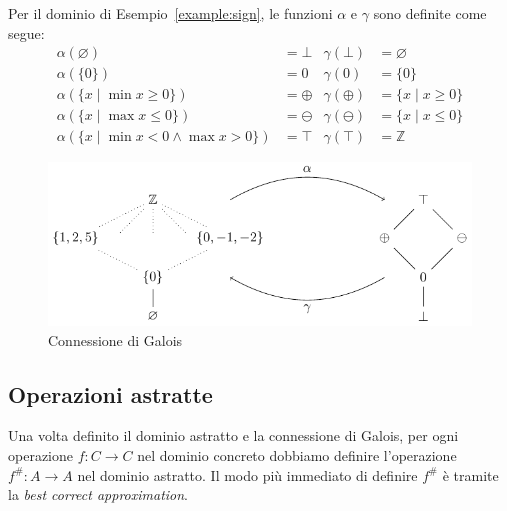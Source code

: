 \begin{example}
Per il dominio di Esempio~\ref{example:sign}, le funzioni $\alpha$ e $\gamma$ sono definite come segue:
\begin{align*}
    \alpha(\varnothing)                                   & = \bot                 &
    \gamma(\bot)                                          & = \varnothing          \\
    \alpha(\{0\})                                         & = 0                    &
    \gamma(0)                                             & = \{ 0 \}              \\
    \alpha(\{ x \mid \min x \ge 0 \}) & = \oplus          &
    \gamma(\oplus)                                        & = \{ x \mid x \ge 0 \} \\
    \alpha(\{ x \mid \max x \le 0 \}) & = \ominus         &
    \gamma(\ominus)                                       & = \{ x \mid x \le 0 \} \\
    \alpha(\{ x \mid \min x < 0 \land \max x > 0\})       & = \top                 &
    \gamma(\top)                                          & = \mathbb{Z}
\end{align*}
\end{example}

\begin{figure}[htbp]
    \centering
    \includegraphics{capitoli/interpretazione-astratta/immagini/reticolo-segni.pdf}
    \caption{Connessione di Galois}
    \label{fig:galois-Z-sign}
\end{figure}

\subsection{Operazioni astratte}

Una volta definito il dominio astratto e la connessione di Galois, per ogni operazione $f : C \to C$ nel dominio concreto dobbiamo definire l'operazione $f^{\#} : A \to A$ nel dominio astratto. Il modo più immediato di definire $f^{\#}$ è tramite la \emph{best correct approximation}.

